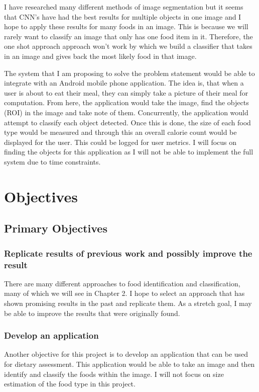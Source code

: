 I have researched many different methods of image segmentation but it seems that CNN's have had the best results for multiple objects in one image and I hope to apply these results for many foods in an image.
This is because we will rarely want to classify an image that only has one food
item in it. Therefore, the one shot approach approach won't work by which we
build a classifier that takes in an image and gives back the most likely food in
that image.

The system that I am proposing to solve the problem statement would be able to
integrate with an Android mobile phone application.
The idea is, that when a user is about to eat their meal, they can simply take a picture of their meal for computation.
From here, the application would take the image, find the objects (ROI) in the image and take note of them.
Concurrently, the application would attempt to classify each object detected.
Once this is done, the size of each food type would be measured and through this an overall calorie count would be displayed for the user.
This could be logged for user metrics. 
I will focus on finding the objects for this application as I will not be able to implement the full system due to time constraints.

\section{Objectives}
\subsection*{Primary Objectives}
\subsubsection*{Replicate results of previous work and possibly improve the
result}
There are many different approaches to food identification and classification,
many of which we will see in Chapter 2. I hope to select an approach that has
shown promising results in the past and replicate them. As a stretch goal, I may
be able to improve the results that were originally found.

\subsubsection*{Develop an application}
Another objective for this project is to develop an application that can be used
for dietary assessment. This application would be able to take an image and then
identify and classify the foods within the image. I will not focus on size
estimation of the food type in this project.

